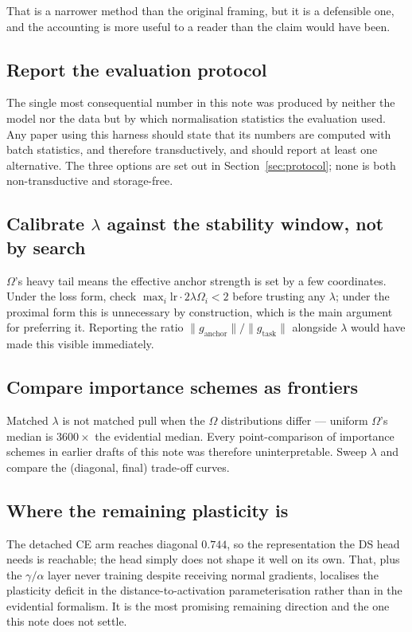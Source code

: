 \documentclass{article}
\begin{document}
That is a narrower method than the original framing, but it is a defensible one,
and the accounting is more useful to a reader than the claim would have been.

\subsection{Report the evaluation protocol}

The single most consequential number in this note was produced by neither the
model nor the data but by which normalisation statistics the evaluation used.
Any paper using this harness should state that its numbers are computed with
batch statistics, and therefore transductively, and should report at least one
alternative. The three options are set out in Section~\ref{sec:protocol}; none is
both non-transductive and storage-free.

\subsection{Calibrate $\lambda$ against the stability window, not by search}

$\Omega$'s heavy tail means the effective anchor strength is set by a few
coordinates. Under the loss form, check $\max_i \mathrm{lr} \cdot 2\lambda\Omega_i
< 2$ before trusting any $\lambda$; under the proximal form this is unnecessary by
construction, which is the main argument for preferring it. Reporting the ratio
$\lVert g_{\text{anchor}}\rVert / \lVert g_{\text{task}}\rVert$ alongside
$\lambda$ would have made this visible immediately.

\subsection{Compare importance schemes as frontiers}

Matched $\lambda$ is not matched pull when the $\Omega$ distributions differ ---
uniform $\Omega$'s median is $3600\times$ the evidential median. Every
point-comparison of importance schemes in earlier drafts of this note was
therefore uninterpretable. Sweep $\lambda$ and compare the (diagonal, final)
trade-off curves.

\subsection{Where the remaining plasticity is}

The detached CE arm reaches diagonal $0.744$, so the representation the DS head
needs is reachable; the head simply does not shape it well on its own. That, plus
the $\gamma/\alpha$ layer never training despite receiving normal gradients,
localises the plasticity deficit in the distance-to-activation parameterisation
rather than in the evidential formalism. It is the most promising remaining
direction and the one this note does not settle.
\end{document}
